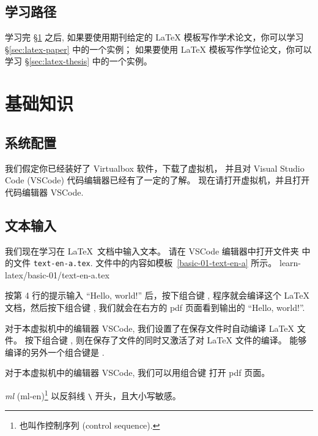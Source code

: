 \documentclass[
    11pt,
    base=hide,
    cite=authoryear,
    device=phone,
    lang=cn,
    mode=simple,
    result=answer,
    toc=onecol,
]{elegantbook_sierxue}
\begin{document}
\subsection*{学习路径}%
\label{sec:latex-learning}

学习完 \S\ref{sec:latex-basic} 之后,
如果要使用期刊给定的 \LaTeX{} 模板写作学术论文，你可以学习
\S\ref{sec:latex-paper} 中的一个实例；
如果要使用 \LaTeX{} 模板写作学位论文，你可以学习
\S\ref{sec:latex-thesis} 中的一个实例。

\section{基础知识}%
\label{sec:latex-basic}

\subsection*{系统配置}%
\label{sub:vm-vscode}

我们假定你已经装好了 Virtualbox 软件，下载了虚拟机，
并且对 Visual Studio Code (VSCode) 代码编辑器已经有了一定的了解。
现在请打开虚拟机，并且打开代码编辑器 VSCode.

\subsection{文本输入}%
\label{sub:latex-text}

我们现在学习在 \LaTeX\ 文档中输入文本。
请在 VSCode 编辑器中打开文件夹 
中的文件 \texttt{text-en-a.tex}.
文件中的内容如模板~\ref{basic-01-text-en-a} 所示。
%
{learn-latex/basic-01/text-en-a.tex}

按第 4 行的提示输入 ``Hello, world!'' 后，按下组合键 ,
程序就会编译这个 {\LaTeX} 文档，然后按下组合键 ,
我们就会在右方的 pdf 页面看到输出的 ``Hello, world!''.
\begin{tip}\label{tip:vscode-shortcut-compile}
    对于本虚拟机中的编辑器 VSCode,
    我们设置了在保存文件时自动编译 {\LaTeX} 文件。
    按下组合键 ,
    则在保存了文件的同时又激活了对 {\LaTeX} 文件的编译。
    能够编译的另外一个组合键是 .
\end{tip}
\begin{tip}\label{tip:vscode-shortcut-pdfviewer}
    对于本虚拟机中的编辑器 VSCode,
    我们可以用组合键  打开 pdf 页面。
\end{tip}
\begin{latex}\label{tex:command}
    \emph{\gls{ml}} (\gls{ml-en})\footnote{
        也叫作控制序列 (control sequence).}
    以反斜线 \texttt{\textbackslash}
    开头，且大小写敏感。
\end{latex}
\end{document}
